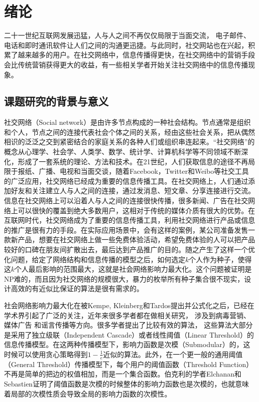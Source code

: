 
\chapter{绪论}
二十一世纪互联网发展迅猛，人与人之间不再仅仅局限于当面交流，
电子邮件、电话和即时通讯软件让人们之间的沟通更迅捷。与此同时，社交网站也在兴起，积累了越来越多的用户。在社交网络中，信息传播得更快，在社交网络中的营销手段会比传统营销获得更大的收益，有一些相关学者开始关注社交网络中的信息传播现象。


\section{课题研究的背景与意义}
社交网络（Social network）是由许多节点构成的一种社会结构。节点通常是组织和个人，节点之间的连接代表社会个体之间的关系，经由这些社会关系，把从偶然相识的泛泛之交到紧密结合的家庭关系的各种人们或组织串连起来。“社交网络”的概念从心理学、社会学、人类学、数学、统计学、计算机科学等不同领域不断深化，形成了一套系统的理论、方法和技术。在21世纪，人们获取信息的途径不再局限于报纸、广播、电视和当面交谈，随着Facebook，Twitter和Weibo等社交工具的广泛应用，社交网络已经成为重要的信息传播工具。在社交网络上，人们通过添加好友和关注建立人与人之间的连接，通过发消息、短文章、分享连接进行交流。信息在社交网络上可以沿着人与人之间的连接很快传播，很多新闻、广告在社交网络上可以很快的覆盖到绝大多数用户，这相对于传统的媒体介质有很大的优势。在互联网时代，社交网络成为了重要的信息传播工具，利用社交网络进行产品或信息的推广是很有力的手段。在实际应用场景中，会有这样的案例，某公司准备发售一款新产品，想要在社交网络上做一些免费体验活动，希望免费体验的人可以把产品较好的口碑在朋友间扩散出去，最后达到产品推广的目的。随之产生了这样一个优化问题，给定了网络结构和信息传播的模型之后，如何选定$k$个人作为种子，使得这$k$个人最后影响的范围最大，这就是社会网络影响力最大化\cite{Kempe2003maximizing}。这个问题被证明是NP难的，而且因为社交网络的规模很大，暴力的枚举所有种子集合很不现实，设计高效的有近似比保证的算法是很有需求的。

社会网络影响力最大化在被Kempe, Kleinberg和Tardos\cite{Kempe2003maximizing}提出并公式化之后，已经在学术界引起了广泛的关注，近年来很多学者都在做相关研究，
涉及到病毒营销\cite{arthur2009pricing,Subramani2003knowledge,barbieri2014influence,Chen2015combining}、
媒体广告\cite{li2011labeled,bakshy2012advertising,Aslay2015viral}
和谣言传播\cite{carnes2007maximizing,kostka2008word,borodin2010competitive,he2012influence,Wang2016drimux}等方向。很多学者提出了比较有效的算法\cite{Kempe2003maximizing,Leskovec2007celf,Chen2009efficient,chen2010sharpphard,goyal2011celfplus,Goyal2011simpath,tang2014newrrset}，
这些算法大部分是采用了独立级联（Independent Cascade）或者线性阈值（Linear Threshold）\cite{Kempe2003maximizing}的信息传播模型。在这两种传播模型下，影响力函数是次模（Submodular）的，这时候可以使用贪心策略得到$1-\frac{1}{e}$近似的算法。此外，在一个更一般的通用阈值（General Threshold）\cite{Kempe2003maximizing}传播模型下，每个用户的阈值函数（Threshold Function）不再是简单的把边的权值相加，而是一个集合函数。伯克利的学者Elchanan和Sebastien\cite{Mossel2007sub}证明了阈值函数是次模的时候整体的影响力函数也是次模的，也就意味着局部的次模性质会导致全局的影响力函数的次模性。


